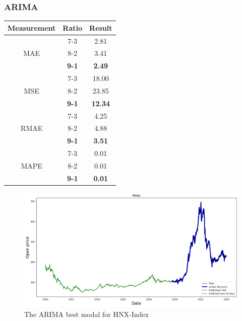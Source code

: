 \documentclass{ieeeojies}
\begin{document}
\subsubsection{ARIMA}
\begin{table}[H]
    \centering
    \begin{tabular}{|c|c|c|}
        \hline
         Measurement & Ratio &  Result  \\
        \hline
             & 7-3 & 2.81  \\
        MAE  & 8-2 & 3.41  \\
            & \textbf{9-1} & \textbf{2.49}  \\
        \hline
           & 7-3 & 18.00  \\
        MSE  & 8-2 & 23.85  \\
            & \textbf{9-1} & \textbf{12.34}  \\
        \hline
           & 7-3 & 4.25  \\
        RMAE  & 8-2 & 4.88  \\
            & \textbf{9-1} & \textbf{3.51}  \\
        \hline
           & 7-3 & 0.01  \\
        MAPE  & 8-2 & 0.01  \\
            & \textbf{9-1} & \textbf{0.01}  \\
        \hline
    \end{tabular}
    \label{table:example}
\end{table}
\begin{figure}[H]
    \centering
    \includegraphics[width=0.8\linewidth]{A91.jpg}
    \caption{The ARIMA best modal for HNX-Index}
    \label{fig:example}
\end{figure} 
\end{document}
